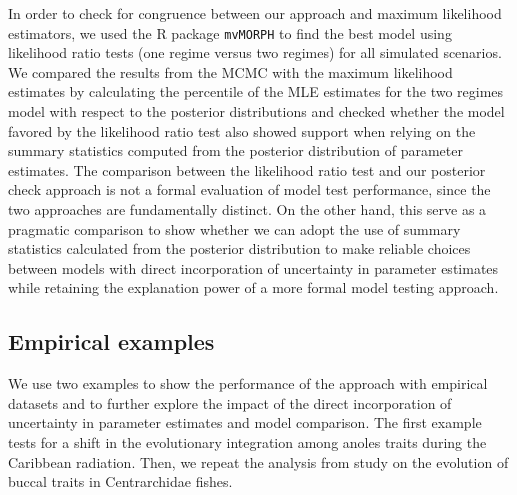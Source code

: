 In order to check for congruence between our approach and maximum likelihood estimators, we used the R package \texttt{mvMORPH} \citep{Clavel_mvmorph} to find the best model using likelihood ratio tests (one regime versus two regimes) for all simulated scenarios. We compared the results from the MCMC with the maximum likelihood estimates by calculating the percentile of the MLE estimates for the two regimes model with respect to the posterior distributions and checked whether the model favored by the likelihood ratio test also showed support when relying on the summary statistics computed from the posterior distribution of parameter estimates. The comparison between the likelihood ratio test and our posterior check approach is not a formal evaluation of model test performance, since the two approaches are fundamentally distinct. On the other hand, this serve as a pragmatic comparison to show whether we can adopt the use of summary statistics calculated from the posterior distribution to make reliable choices between models with direct incorporation of uncertainty in parameter estimates while retaining the explanation power of a more formal model testing approach.

\subsection{Empirical examples}

We use two examples to show the performance of the approach with empirical datasets and to further explore the impact of the direct incorporation of uncertainty in parameter estimates and model comparison. The first example tests for a shift in the evolutionary integration among anoles traits during the Caribbean radiation. Then, we repeat the analysis from \citet{revell_phylogenetic_2009} study on the evolution of buccal traits in Centrarchidae fishes. 


